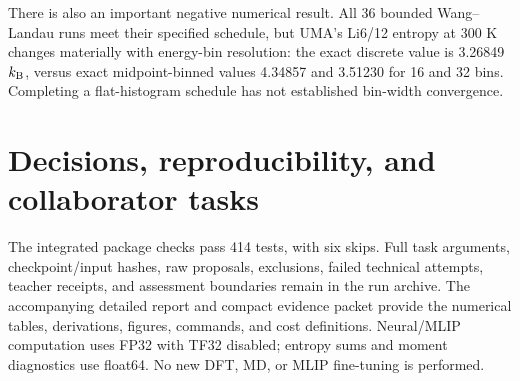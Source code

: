 \documentclass[11pt]{article}
\newcommand{\kb}{k_{\rm B}}
\begin{document}
There is also an important negative numerical result. All 36 bounded
Wang--Landau runs \cite{wanglandau} meet their specified schedule, but UMA's
Li6/12 entropy at 300 K changes materially with energy-bin resolution:
the exact discrete value is 3.26849\,$\kb$, versus exact midpoint-binned
values 4.34857 and 3.51230 for 16 and 32 bins. Completing a flat-histogram
schedule has not established bin-width convergence.

\section{Decisions, reproducibility, and collaborator tasks}


The integrated package checks pass 414 tests, with six skips. Full task
arguments, checkpoint/input hashes, raw proposals, exclusions, failed
technical attempts, teacher receipts, and assessment boundaries remain in
the run archive. The accompanying detailed report and compact evidence
packet provide the numerical tables, derivations, figures, commands, and
cost definitions. Neural/MLIP computation uses FP32 with TF32 disabled;
entropy sums and moment diagnostics use float64. No new DFT, MD, or MLIP
fine-tuning is performed.



\end{document}
